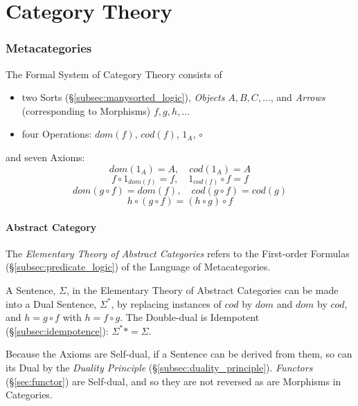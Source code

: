 \part{Category Theory}\label{sec:category_theory}\cite{awodey06}\cite{maclane69}

\section{Metacategories}\label{sec:metacategory}

The Formal System of Category Theory consists of
\begin{itemize}
\item two Sorts (\S\ref{subsec:manysorted_logic}), \emph{Objects}
  $A,B,C,\ldots$, and \emph{Arrows} (corresponding to Morphisms)
  $f,g,h,\ldots$
\item four Operations: $dom(f)$, $cod(f)$, $1_A$, $\circ$
\end{itemize}
and seven Axioms:
\[
    dom(1_A) = A,\quad cod(1_A) = A
\]\[
    f \circ 1_{dom(f)} = f, \quad 1_{cod(f)} \circ f = f
\]\[
    dom(g\circ f) = dom(f), \quad cod(g \circ f) = cod(g)
\]\[
    h \circ (g \circ f) = (h \circ g) \circ f
\]



\subsection{Abstract Category}\label{subsec:abstract_category}

The \emph{Elementary Theory of Abstract Categories} refers to the
First-order Formulas (\S\ref{subsec:predicate_logic}) of the Language
of Metacategories.

A Sentence, $\Sigma$, in the Elementary Theory of Abstract Categories
can be made into a Dual Sentence, $\Sigma^*$, by replacing instances
of $cod$ by $dom$ and $dom$ by $cod$, and $h = g \circ f$ with $h = f
\circ g$. The Double-dual is Idempotent (\S\ref{subsec:idempotence}):
$\Sigma^** = \Sigma$.

Because the Axioms are Self-dual, if a Sentence can be derived from
them, so can its Dual by the \emph{Duality Principle}
(\S\ref{subsec:duality_principle}). \emph{Functors}
(\S\ref{sec:functor}) are Self-dual, and so they are not reversed as
are Morphisms in Categories.



